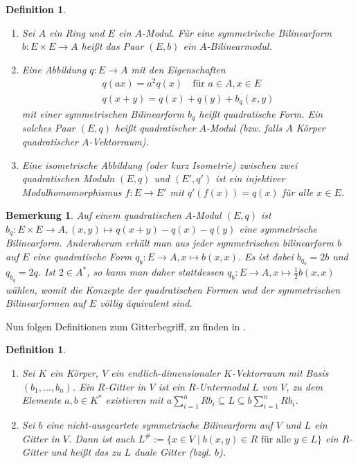 \documentclass[12pt,a4paper,halfparskip,headsepline, bibtotocnumbered]{scrreprt}
\theoremstyle{nummermitklammern}
\newtheorem{definition}[defsatzusw]{Definition}
\newtheorem{bemerkung}[defsatzusw]{Bemerkung}
\theoremstyle{nonumberbreak}
\begin{document}
\begin{framed}
	\begin{definition}
		\begin{enumerate}[label=(\roman*)]
			\item Sei $A$ ein Ring und $E$ ein $A$-Modul. Für eine symmetrische Bilinearform $b : E \times E \rightarrow A$ heißt das Paar $(E,b)$ ein \textit{$A$-Bilinearmodul}.
			\item Eine Abbildung $q : E \rightarrow A$ mit den Eigenschaften
				\begin{align*}
					q(ax) = a^2 q(x)\quad \text{für } a \in A, x \in E\\
					q(x+y) = q(x) + q(y) + b_q(x,y)
				\end{align*}
				mit einer symmetrischen Bilinearform $b_q$ heißt \textit{quadratische Form}. Ein solches Paar $(E,q)$ heißt \textit{quadratischer $A$-Modul} (bzw. falls $A$ Körper \textit{quadratischer $A$-Vektorraum}).
			\item Eine \textit{isometrische Abbildung} (oder kurz \textit{Isometrie}) zwischen zwei quadratischen Moduln $(E,q)$ und $(E', q')$ ist ein injektiver Modulhomomorphismus $f : E \rightarrow E'$ mit $q'(f(x)) = q(x)$ für alle $x \in E$.
		\end{enumerate}
	\end{definition}
\end{framed}

\begin{bemerkung}
	Auf einem quadratischen $A$-Modul $(E,q)$ ist $b_q : E \times E \rightarrow A, (x,y) \mapsto q(x+y) - q(x) - q(y)$ eine symmetrische Bilinearform. Andersherum erhält man aus jeder symmetrischen bilinearform $b$ auf $E$ eine quadratische Form $q_b : E \rightarrow A, x \mapsto b(x,x)$. Es ist dabei $b_{q_b} = 2b$ und $q_{b_q} = 2q$. Ist $2 \in A^*$, so kann man daher stattdessen $q_b : E \rightarrow A, x \mapsto \frac{1}{2} b(x,x)$ wählen, womit die Konzepte der quadratischen Formen und der symmetrischen Bilinearformen auf $E$ völlig äquivalent sind.
\end{bemerkung}

Nun folgen Definitionen zum Gitterbegriff, zu finden in \cite[Def. (14.1), (14.2)]{kneser}.
\begin{framed}
	\begin{definition}
		\begin{enumerate}[label=(\roman*)]
			\item Sei $K$ ein Körper, $V$ ein endlich-dimensionaler $K$-Vektorraum mit Basis $(b_1,\dots,b_n)$. Ein $R$-Gitter in $V$ ist ein $R$-Untermodul $L$ von $V$, zu dem Elemente $a,b \in K^*$ existieren mit $a \sum_{i=1}^n R b_i \subseteq L \subseteq b \sum_{i=1}^n R b_i$.
			\item Sei $b$ eine nicht-ausgeartete symmetrische Bilinearform auf $V$ und $L$ ein Gitter in $V$. Dann ist auch $L^\# := \lbrace x \in V \mid b(x,y) \in R \text{ für alle } y \in L \rbrace$ ein $R$-Gitter und heißt \textit{das zu $L$ duale Gitter} (bzgl. $b$).
		\end{enumerate}
	\end{definition}
\end{framed}
\end{document}

